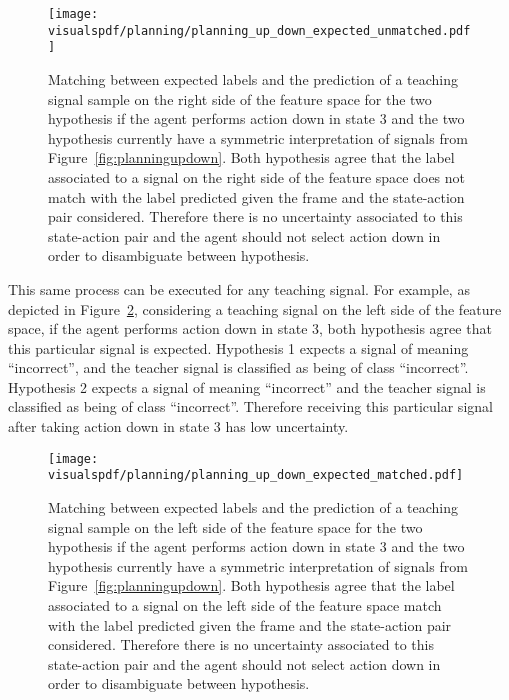 \begin{figure}[!ht]
  \centering
  \texttt{[image: \\visualspdf/planning/planning\_up\_down\_expected\_unmatched.pdf]}
  \caption{Matching between expected labels and the prediction of a teaching signal sample on the right side of the feature space for the two hypothesis if the agent performs action down in state 3 and the two hypothesis currently have a symmetric interpretation of signals from Figure~\ref{fig:planningupdown}. Both hypothesis agree that the label associated to a signal on the right side of the feature space does not match with the label predicted given the frame and the state-action pair considered. Therefore there is no uncertainty associated to this state-action pair and the agent should not select action down in order to disambiguate between hypothesis.}
  \label{fig:uncertaintymeaningupdownexpectedright}
\end{figure}

This same process can be executed for any teaching signal. For example, as depicted in Figure~\ref{fig:uncertaintymeaningupdownexpectedleft}, considering a teaching signal on the left side of the feature space, if the agent performs action down in state 3, both hypothesis agree that this particular signal is expected. Hypothesis 1 expects a signal of meaning ``incorrect'', and the teacher signal is classified as being of class ``incorrect''. Hypothesis 2 expects a signal of meaning ``incorrect'' and the teacher signal is classified as being of class ``incorrect''. Therefore receiving this particular signal after taking action down in state 3 has low uncertainty.

\begin{figure}[!ht]
  \centering
  \texttt{[image: \\visualspdf/planning/planning\_up\_down\_expected\_matched.pdf]}
  \caption{Matching between expected labels and the prediction of a teaching signal sample on the left side of the feature space for the two hypothesis if the agent performs action down in state 3 and the two hypothesis currently have a symmetric interpretation of signals from Figure~\ref{fig:planningupdown}. Both hypothesis agree that the label associated to a signal on the left side of the feature space match with the label predicted given the frame and the state-action pair considered. Therefore there is no uncertainty associated to this state-action pair and the agent should not select action down in order to disambiguate between hypothesis.}
  \label{fig:uncertaintymeaningupdownexpectedleft}
\end{figure}

